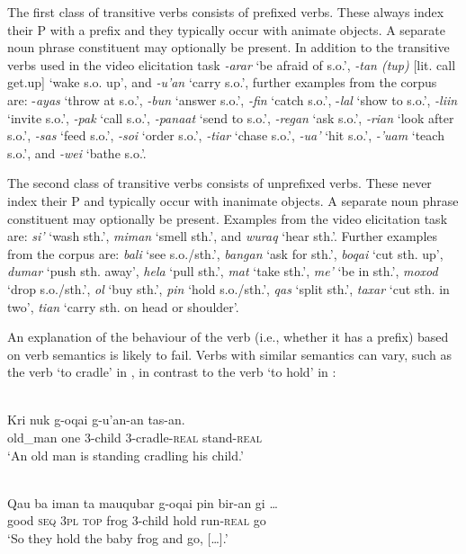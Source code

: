 The first class of transitive verbs consists of prefixed verbs. These always index their P with a prefix and they typically occur with animate objects. A separate noun phrase constituent may optionally be present. In addition to the transitive verbs used in the video elicitation task \textit{{}-arar} `be afraid of s.o.', \textit{{}-tan (tup)} [lit. call get.up] `wake s.o. up', and \textit{{}-u'an} `carry s.o.', further examples from the corpus are: -\textit{ayas} `throw at s.o.', \textit{{}-bun} `answer s.o.', \textit{{}-fin} `catch s.o.', -\textit{lal} `show to s.o.', \textit{{}-liin} `invite s.o.', \textit{{}-pak} `call s.o.', \textit{{}-panaat} `send to s.o.', \textit{{}-regan} `ask s.o.', \textit{{}-rian} `look after s.o.', \textit{{}-sas} `feed s.o.', \textit{{}-soi} `order s.o.', \textit{{}-tiar} `chase s.o.', \textit{{}-ua'} `hit s.o.', \textit{{}-'uam} `teach s.o.', and \textit{{}-wei} `bathe s.o.'. 

The second class of transitive verbs consists of unprefixed verbs. These never index their P and typically occur with inanimate objects. A separate noun phrase constituent may optionally be present. Examples from the video elicitation task are: \textit{si'} `wash sth.', \textit{miman} `smell sth.', and \textit{wuraq} `hear sth.'. Further examples from the corpus are: \textit{bali} `see s.o./sth.', \textit{bangan} `ask for sth.', \textit{boqai} `cut sth. up', \textit{dumar} `push sth. away', \textit{hela} `pull sth.', \textit{mat} `take sth.', \textit{me'} `be in sth.', \textit{moxod} `drop s.o./sth.', \textit{ol} `buy sth.', \textit{pin} `hold s.o./sth.', \textit{qas} `split sth.', \textit{taxar} `cut sth. in two', \textit{tian} `carry sth. on head or shoulder'.

An explanation of the behaviour of the verb (i.e., whether it has a prefix) based on verb semantics is likely to fail. Verbs with similar semantics can vary, such as the verb `to cradle' in , in contrast to the verb `to hold' in :


\ea 
\label{ex:10:1244}
 \\ 
 \gll    Kri  nuk  g-oqai  g-u'an-an  tas-an.\\
  old\_man  one  3-child  3-cradle-\textsc{real} stand-\textsc{real}  \\
 \glt `An old man is standing cradling his child.'
\z
 
\ea 
\label{ex:10:1245}
 \\ 
 \gll   Qau  ba  iman  ta    mauqubar  g-oqai  pin  bir-an  gi  {\ob}{\dots}{\cb} \\
    good  \textsc{seq}  \textsc{3pl}  \textsc{top}  frog  3-child  hold  run-\textsc{real}  go \\
 \glt  `So they hold the baby frog and go, [{\dots}].' 
\z

